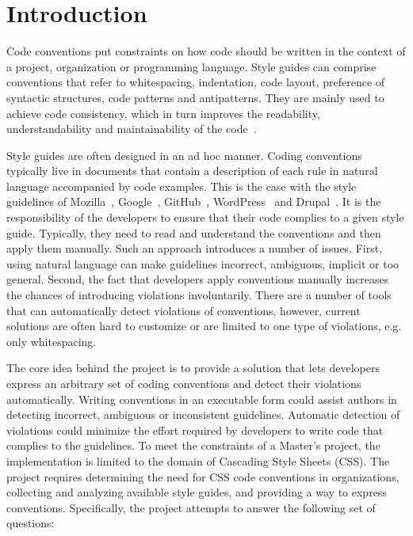 \chapter{Introduction}

Code conventions put constraints on how code should be written in the context
of a project, organization or programming language. Style guides can comprise
conventions that refer to whitespacing, indentation, code layout, preference
of syntactic structures, code patterns and antipatterns. They are mainly used
to achieve code consistency, which in turn improves the readability,
understandability and maintainability of the
code~\cite{Buse2010,tenny1988program}.

Style guides are often designed in an ad hoc manner. Coding conventions typically live in documents
that contain a description of each rule in natural language accompanied by code examples. This is
the case with the style guidelines of Mozilla~\cite{Mozilla}, Google~\cite{Google},
GitHub~\cite{GitHub}, WordPress~\cite{Wordpress} and Drupal~\cite{Drupal}. It is the responsibility
of the developers to ensure that their code complies to a given style guide. Typically, they need to
read and understand the conventions and then apply them manually. Such an approach introduces a
number of issues. First, using natural language can make guidelines incorrect, ambiguous, implicit
or too general. Second, the fact that developers apply conventions manually increases the chances of
introducing violations involuntarily. There are a number of tools that can automatically detect
violations of conventions, however, current solutions are often hard to customize or are limited to
one type of violations, e.g. only whitespacing.

The core idea behind the project is to provide a solution that lets developers express an arbitrary
set of coding conventions and detect their violations automatically. Writing conventions
in an executable form could assist authors in detecting incorrect, ambiguous or inconsistent
guidelines. Automatic detection of violations could minimize the effort required by developers to
write code that complies to the guidelines. To meet the constraints of a Master’s project, the
implementation is limited to the domain of Cascading Style Sheets (CSS). The project requires
determining the need for CSS code conventions in organizations, collecting and analyzing available
style guides, and providing a way to express conventions. Specifically, the project attempts to
answer the following set of questions:

